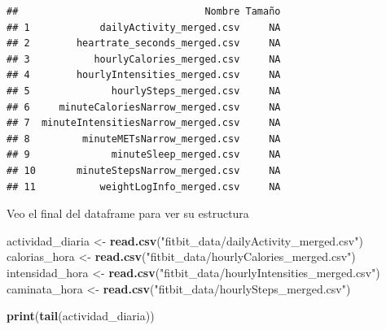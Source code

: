 \documentclass[
]{article}
\newenvironment{Shaded}{\begin{snugshade}}{\end{snugshade}}
\newcommand{\FunctionTok}[1]{\textcolor[rgb]{0.13,0.29,0.53}{\textbf{#1}}}
\newcommand{\NormalTok}[1]{#1}
\newcommand{\OtherTok}[1]{\textcolor[rgb]{0.56,0.35,0.01}{#1}}
\newcommand{\StringTok}[1]{\textcolor[rgb]{0.31,0.60,0.02}{#1}}
\begin{document}
\begin{verbatim}
##                                Nombre Tamaño
## 1            dailyActivity_merged.csv     NA
## 2        heartrate_seconds_merged.csv     NA
## 3           hourlyCalories_merged.csv     NA
## 4        hourlyIntensities_merged.csv     NA
## 5              hourlySteps_merged.csv     NA
## 6     minuteCaloriesNarrow_merged.csv     NA
## 7  minuteIntensitiesNarrow_merged.csv     NA
## 8         minuteMETsNarrow_merged.csv     NA
## 9              minuteSleep_merged.csv     NA
## 10       minuteStepsNarrow_merged.csv     NA
## 11           weightLogInfo_merged.csv     NA
\end{verbatim}

Veo el final del dataframe para ver su estructura

\begin{Shaded}
\begin{Highlighting}[]
\NormalTok{actividad\_diaria }\OtherTok{\textless{}{-}} \FunctionTok{read.csv}\NormalTok{(}\StringTok{"fitbit\_data/dailyActivity\_merged.csv"}\NormalTok{)}
\NormalTok{calorias\_hora }\OtherTok{\textless{}{-}} \FunctionTok{read.csv}\NormalTok{(}\StringTok{"fitbit\_data/hourlyCalories\_merged.csv"}\NormalTok{)}
\NormalTok{intensidad\_hora }\OtherTok{\textless{}{-}} \FunctionTok{read.csv}\NormalTok{(}\StringTok{"fitbit\_data/hourlyIntensities\_merged.csv"}\NormalTok{)}
\NormalTok{caminata\_hora }\OtherTok{\textless{}{-}} \FunctionTok{read.csv}\NormalTok{(}\StringTok{"fitbit\_data/hourlySteps\_merged.csv"}\NormalTok{)}

\FunctionTok{print}\NormalTok{(}\FunctionTok{tail}\NormalTok{(actividad\_diaria))}
\end{Highlighting}
\end{Shaded}
\end{document}
